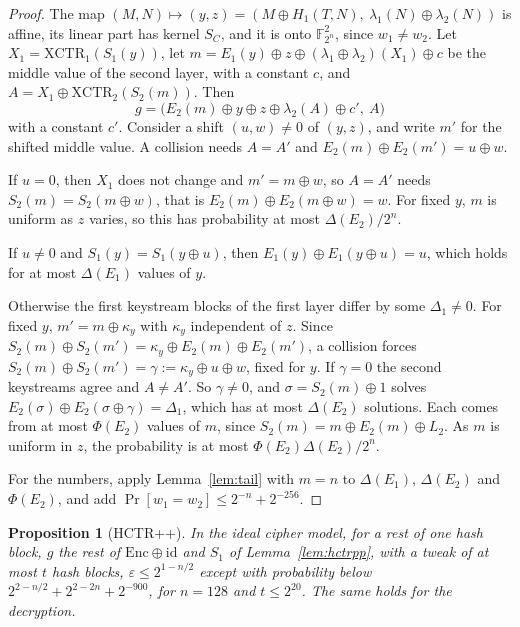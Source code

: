 \documentclass[11pt]{article}
\newtheorem{proposition}[theorem]{Proposition}
\theoremstyle{definition}
\theoremstyle{remark}
\newcommand{\F}{\mathbb{F}}
\newcommand{\Enc}{\mathrm{Enc}}
\newcommand{\XCTR}{\mathrm{XCTR}}
\newcommand{\eps}{\varepsilon}
\newcommand{\Dl}{\Delta}
\begin{document}
\begin{proof}
The map $(M,N)\mapsto(y,z)=(M\oplus H_1(T,N),\ \lambda_1(N)\oplus\lambda_2(N))$ is affine, its linear part has kernel $S_C$, and it is onto $\F_{2^n}^2$, since $w_1\ne w_2$. Let $X_1=\XCTR_1(S_1(y))$, let $m=E_1(y)\oplus z\oplus(\lambda_1\oplus\lambda_2)(X_1)\oplus c$ be the middle value of the second layer, with a constant $c$, and $A=X_1\oplus\XCTR_2(S_2(m))$. Then
\[
g=\bigl(E_2(m)\oplus y\oplus z\oplus\lambda_2(A)\oplus c',\ A\bigr)
\]
with a constant $c'$. Consider a shift $(u,w)\ne0$ of $(y,z)$, and write $m'$ for the shifted middle value. A collision needs $A=A'$ and $E_2(m)\oplus E_2(m')=u\oplus w$.

If $u=0$, then $X_1$ does not change and $m'=m\oplus w$, so $A=A'$ needs $S_2(m)=S_2(m\oplus w)$, that is $E_2(m)\oplus E_2(m\oplus w)=w$. For fixed $y$, $m$ is uniform as $z$ varies, so this has probability at most $\Dl(E_2)/2^n$.

If $u\ne0$ and $S_1(y)=S_1(y\oplus u)$, then $E_1(y)\oplus E_1(y\oplus u)=u$, which holds for at most $\Dl(E_1)$ values of $y$.

Otherwise the first keystream blocks of the first layer differ by some $\Dl_1\ne0$. For fixed $y$, $m'=m\oplus\kappa_y$ with $\kappa_y$ independent of $z$. Since $S_2(m)\oplus S_2(m')=\kappa_y\oplus E_2(m)\oplus E_2(m')$, a collision forces $S_2(m)\oplus S_2(m')=\gamma:=\kappa_y\oplus u\oplus w$, fixed for $y$. If $\gamma=0$ the second keystreams agree and $A\ne A'$. So $\gamma\ne0$, and $\sigma=S_2(m)\oplus1$ solves $E_2(\sigma)\oplus E_2(\sigma\oplus\gamma)=\Dl_1$, which has at most $\Dl(E_2)$ solutions. Each comes from at most $\Phi(E_2)$ values of $m$, since $S_2(m)=m\oplus E_2(m)\oplus L_2$. As $m$ is uniform in $z$, the probability is at most $\Phi(E_2)\Dl(E_2)/2^n$.

For the numbers, apply Lemma~\ref{lem:tail} with $m=n$ to $\Dl(E_1)$, $\Dl(E_2)$ and $\Phi(E_2)$, and add $\Pr[w_1=w_2]\le2^{-n}+2^{-256}$.
\end{proof}

\begin{proposition}[HCTR++]\label{prop:hctrpp}
In the ideal cipher model, for a rest of one hash block, $g$ the rest of $\Enc\oplus\mathrm{id}$ and $S_1$ of Lemma~\ref{lem:hctrpp}, with a tweak of at most $t$ hash blocks, $\eps\le2^{1-n/2}$ except with probability below $2^{2-n/2}+2^{2-2n}+2^{-900}$, for $n=128$ and $t\le2^{20}$. The same holds for the decryption.
\end{proposition}
\end{document}
